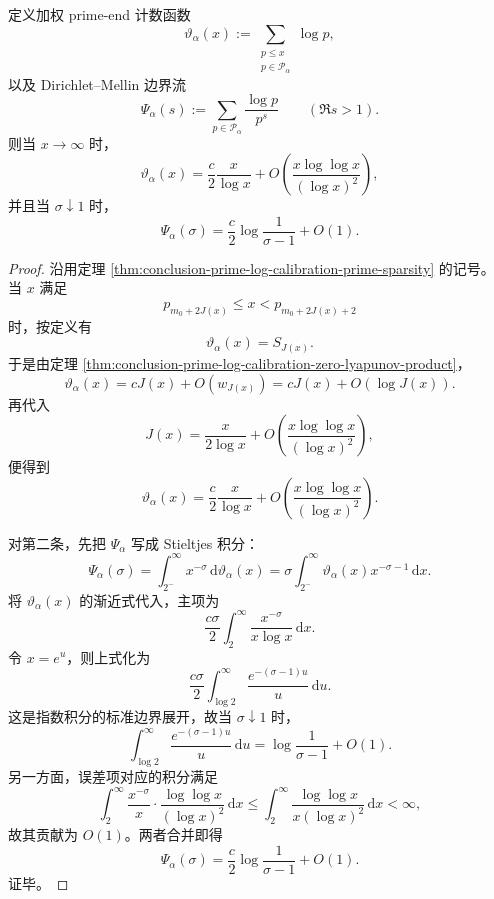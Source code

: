 \begin{theorem}\label{thm:conclusion-prime-log-weighted-boundary-log-singularity}
定义加权 prime-end 计数函数
\[
\vartheta_\alpha(x):=
\sum_{\substack{p\le x\\ p\in\mathcal P_\alpha}}\log p,
\]
以及 Dirichlet--Mellin 边界流
\[
\Psi_\alpha(s):=
\sum_{p\in\mathcal P_\alpha}\frac{\log p}{p^s}
\qquad(\Re s>1).
\]
则当 \(x\to\infty\) 时，
\[
\vartheta_\alpha(x)
=
\frac{c}{2}\frac{x}{\log x}
+O\!\left(\frac{x\log\log x}{(\log x)^2}\right),
\]
并且当 \(\sigma\downarrow 1\) 时，
\[
\Psi_\alpha(\sigma)
=
\frac{c}{2}\log\frac{1}{\sigma-1}+O(1).
\]
\end{theorem}
\begin{proof}
沿用定理 \ref{thm:conclusion-prime-log-calibration-prime-sparsity} 的记号。
当 \(x\) 满足
\[
p_{m_0+2J(x)}\le x<p_{m_0+2J(x)+2}
\]
时，按定义有
\[
\vartheta_\alpha(x)=S_{J(x)}.
\]
于是由定理 \ref{thm:conclusion-prime-log-calibration-zero-lyapunov-product}，
\[
\vartheta_\alpha(x)
=
cJ(x)+O(w_{J(x)})
=
cJ(x)+O(\log J(x)).
\]
再代入
\[
J(x)
=
\frac{x}{2\log x}
+O\!\left(\frac{x\log\log x}{(\log x)^2}\right),
\]
便得到
\[
\vartheta_\alpha(x)
=
\frac{c}{2}\frac{x}{\log x}
+O\!\left(\frac{x\log\log x}{(\log x)^2}\right).
\]

对第二条，先把 \(\Psi_\alpha\) 写成 Stieltjes 积分：
\[
\Psi_\alpha(\sigma)
=
\int_{2^-}^{\infty}x^{-\sigma}\,\mathrm d\vartheta_\alpha(x)
=
\sigma\int_{2^-}^{\infty}\vartheta_\alpha(x)x^{-\sigma-1}\,\mathrm dx.
\]
将 \(\vartheta_\alpha(x)\) 的渐近式代入，主项为
\[
\frac{c\sigma}{2}\int_{2}^{\infty}\frac{x^{-\sigma}}{x\log x}\,\mathrm dx.
\]
令 \(x=e^u\)，则上式化为
\[
\frac{c\sigma}{2}\int_{\log 2}^{\infty}\frac{e^{-(\sigma-1)u}}{u}\,\mathrm du.
\]
这是指数积分的标准边界展开，故当 \(\sigma\downarrow 1\) 时，
\[
\int_{\log 2}^{\infty}\frac{e^{-(\sigma-1)u}}{u}\,\mathrm du
=
\log\frac{1}{\sigma-1}+O(1).
\]
另一方面，误差项对应的积分满足
\[
\int_{2}^{\infty}
\frac{x^{-\sigma}}{x}
\cdot
\frac{\log\log x}{(\log x)^2}\,\mathrm dx
\le
\int_{2}^{\infty}
\frac{\log\log x}{x(\log x)^2}\,\mathrm dx
<
\infty,
\]
故其贡献为 \(O(1)\)。两者合并即得
\[
\Psi_\alpha(\sigma)
=
\frac{c}{2}\log\frac{1}{\sigma-1}+O(1).
\]
证毕。
\end{proof}

